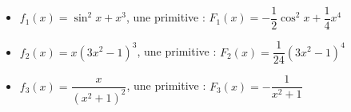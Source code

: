 \begin{example}
\begin{itemize}
  \item $f_1(x) = \sin^2 x + x^3$, une primitive : $F_1(x) = -\dfrac{1}{2} \cos^2 x + \dfrac{1}{4} x^4$
  \item $f_2(x) = x(3x^2 - 1)^3$, une primitive : $F_2(x) = \dfrac{1}{24}(3x^2 - 1)^4$
  \item $f_3(x) = \dfrac{x}{(x^2 + 1)^2}$, une primitive : $F_3(x) = -\dfrac{1}{x^2 + 1}$
\end{itemize}
\end{example}

